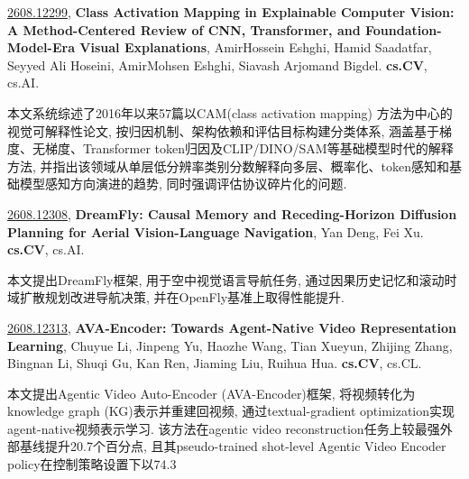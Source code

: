 \documentclass[9pt, a4paper]{article}
\theoremstyle{plain}
\theoremstyle{definition}
\theoremstyle{remark}
\newcommand{\arxivwithtarget}[3]{\hypertarget{#1}{}\href{https://arxiv.org/abs/#1}{#1}, \textbf{\textcolor{arxivblue}{#2}}, #3. }
\begin{document}
\arxivwithtarget{2608.12299}{Class Activation Mapping in Explainable Computer Vision: A Method-Centered Review of CNN, Transformer, and Foundation-Model-Era Visual Explanations}{AmirHossein Eshghi, Hamid Saadatfar, Seyyed Ali Hoseini, AmirMohsen Eshghi, Siavash Arjomand Bigdel}\textbf{cs.CV}, cs.AI.

本文系统综述了2016年以来57篇以CAM(class activation mapping) 方法为中心的视觉可解释性论文, 按归因机制、架构依赖和评估目标构建分类体系, 涵盖基于梯度、无梯度、Transformer token归因及CLIP/DINO/SAM等基础模型时代的解释方法, 并指出该领域从单层低分辨率类别分数解释向多层、概率化、token感知和基础模型感知方向演进的趋势, 同时强调评估协议碎片化的问题.


\arxivwithtarget{2608.12308}{DreamFly: Causal Memory and Receding-Horizon Diffusion Planning for Aerial Vision-Language Navigation}{Yan Deng, Fei Xu}\textbf{cs.CV}, cs.AI.

本文提出DreamFly框架, 用于空中视觉语言导航任务, 通过因果历史记忆和滚动时域扩散规划改进导航决策, 并在OpenFly基准上取得性能提升.


\arxivwithtarget{2608.12313}{AVA-Encoder: Towards Agent-Native Video Representation Learning}{Chuyue Li, Jinpeng Yu, Haozhe Wang, Tian Xueyun, Zhijing Zhang, Bingnan Li, Shuqi Gu, Kan Ren, Jiaming Liu, Ruihua Hua}\textbf{cs.CV}, cs.CL.

本文提出Agentic Video Auto-Encoder (AVA-Encoder)框架, 将视频转化为knowledge graph (KG)表示并重建回视频, 通过textual-gradient optimization实现agent-native视频表示学习. 该方法在agentic video reconstruction任务上较最强外部基线提升20.7个百分点, 且其pseudo-trained shot-level Agentic Video Encoder policy在控制策略设置下以74.3%


    

\end{document}
